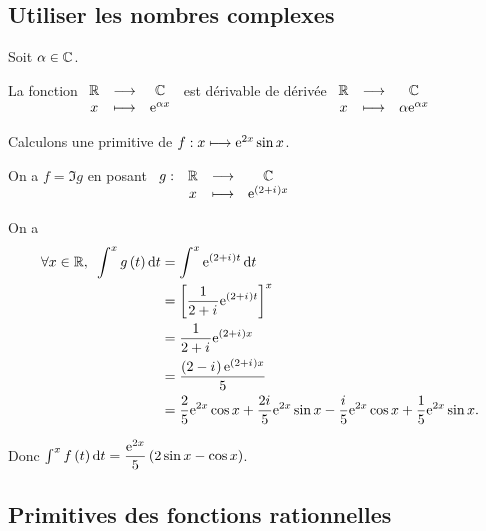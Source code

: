 \subsection{Utiliser les nombres complexes}

\begin{rappel}
Soit \(\alpha\in\mathbb{C}\).

La fonction \(\begin{array}[t]{ccc}\mathbb{R} & \longrightarrow & \mathbb{C} \\ x & \longmapsto & \mathrm{e}^{\alpha x}\end{array}\) est dérivable de dérivée \(\begin{array}[t]{ccc}\mathbb{R} & \longrightarrow & \mathbb{C} \\ x & \longmapsto & \alpha\mathrm{e}^{\alpha x}\end{array}\)
\end{rappel}

\begin{ex}
Calculons une primitive de \(f:x\longmapsto\mathrm{e}^{2x}\sin x\).

On a \(f=\Im g\) en posant \(\begin{array}[t]{cccc}g : & \mathbb{R} & \longrightarrow & \mathbb{C} \\ & x & \longmapsto & \mathrm{e}^{\left(2+i\mkern1mu\right)x}\end{array}\)

On a \[\begin{aligned}
\quantifs{\forall x\in\R}\int^xg\paren{t}\odif{t}&=\int^x\e{\paren{2+\i}t}\odif{t} \\
&=\croch{\dfrac{1}{2+\i}\e{\paren{2+\i}t}}^x \\
&=\dfrac{1}{2+\i}\e{\paren{2+\i}x} \\
&=\dfrac{\paren{2-\i}\e{\paren{2+\i}x}}{5} \\
&=\dfrac{2}{5}\e{2x}\cos x+\dfrac{2\i}{5}\e{2x}\sin x-\dfrac{\i}{5}\e{2x}\cos x+\dfrac{1}{5}\e{2x}\sin x.
\end{aligned}\]

Donc \(\int^xf\paren{t}\odif{t}=\dfrac{\e{2x}}{5}\paren{2\sin x-\cos x}\).
\end{ex}

\subsection{Primitives des fonctions rationnelles}

